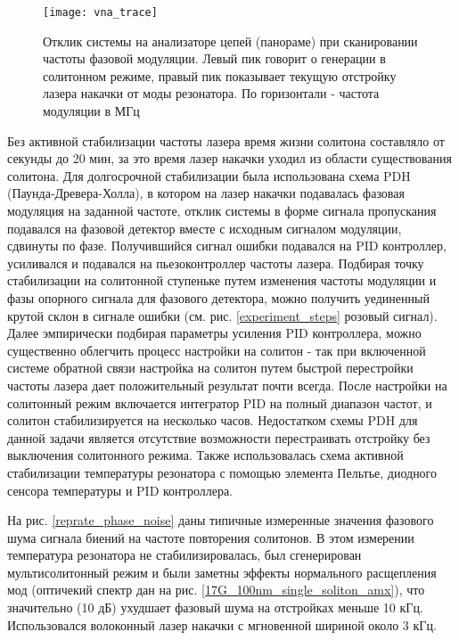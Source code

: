 \begin{figure}[ht]
\centering
  \texttt{[image: vna\_trace]}
  \caption{Отклик системы на анализаторе цепей (панораме) при сканировании частоты фазовой модуляции. Левый пик говорит о генерации в солитонном режиме, правый пик показывает текущую отстройку лазера накачки от моды резонатора. По горизонтали - частота модуляции в МГц}
  \label{vna_trace}
\end{figure}

Без активной стабилизации частоты лазера время жизни солитона составляло от секунды до 20 мин, за это время лазер накачки уходил из области существования солитона. Для долгосрочной стабилизации была использована схема PDH (Паунда-Древера-Холла), в котором на лазер накачки подавалась фазовая модуляция на заданной частоте, отклик системы в форме сигнала пропускания подавался на фазовой детектор вместе с исходным сигналом модуляции, сдвинуты по фазе. Получившийся сигнал ошибки подавался на PID контроллер, усиливался и подавался на пьезоконтроллер частоты лазера. Подбирая точку стабилизации на солитонной ступеньке путем изменения частоты модуляции и фазы опорного сигнала для фазового детектора, можно получить уединенный крутой склон в сигнале ошибки (см. рис. \ref{experiment_steps} розовый сигнал). Далее эмпирически подбирая параметры усиления PID контроллера, можно существенно облегчить процесс настройки на солитон - так при включенной системе обратной связи настройка на солитон путем быстрой перестройки частоты лазера дает положительный результат почти всегда. После настройки на солитонный режим включается интегратор PID на полный диапазон частот, и солитон стабилизируется на несколько часов. Недостатком схемы PDH для данной задачи является отсутствие возможности перестраивать отстройку без выключения солитонного режима. Также использовалась схема активной стабилизации температуры резонатора с помощью элемента Пельтье, диодного сенсора температуры и PID контроллера.

На рис. \ref{reprate_phase_noise} даны типичные измеренные значения фазового шума сигнала биений на частоте повторения солитонов. В этом измерении температура резонатора не стабилизировалась, был сгенерирован мультисолитонный режим и были заметны эффекты нормального расщепления мод (оптичекий спектр дан на рис.  \ref{17G_100nm_single_soliton_amx}), что значительно (10 дБ) ухудшает фазовый шума на отстройках меньше 10 кГц. Использовался волоконный лазер накачки с мгновенной шириной около 3 кГц.



